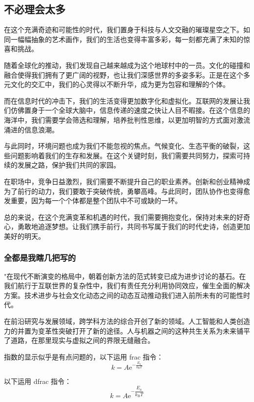 \documentclass[12pt,a4paper]{article}
\begin{document}
	\subsection{不必理会太多}
	\begin{multicols}{2}
		在这个充满奇迹和可能性的时代，我们置身于科技与人文交融的璀璨星空之下。如同一幅幅抽象的艺术画作，我们的生活也变得丰富多彩，每一刻都充满了未知的惊喜和挑战。			
		
		\lipsum[1-3]
		
		随着全球化的推动，我们发现自己越来越成为这个地球村中的一员。文化的碰撞和融合使得我们拥有了更广阔的视野，也让我们深感世界的多姿多彩。正是在这个多元文化的交汇中，我们的心灵得以不断升华，成为更为包容和理解的个体。
		
		而在信息时代的冲击下，我们的生活变得更加数字化和虚拟化。互联网的发展让我们仿佛置身于一个全球大脑中，信息传递的速度之快让人目不暇接。在这个信息的海洋中，我们需要学会筛选和理解，培养批判性思维，以更加明智的方式面对激流涌进的信息浪潮。
	
		与此同时，环境问题也成为我们不能忽视的焦点。气候变化、生态平衡的破裂，这些问题影响着我们的生存和发展。在这个关键时刻，我们需要共同努力，探索可持续的发展之路，保护我们共同的家园。
		
		在职场中，竞争日益激烈，我们需要不断提升自己的职业素养。创新和创业精神成为了前行的动力，我们要敢于突破传统，勇攀高峰。与此同时，团队协作也变得愈发重要，因为每一个个体都是整个团队中不可或缺的一环。
		
		总的来说，在这个充满变革和机遇的时代，我们需要拥抱变化，保持对未来的好奇心，勇敢地追逐梦想。让我们携手前行，共同书写属于我们的时代史诗，创造更加美好的明天。
	\end{multicols}
	\subsubsection{全都是我瞎几把写的}
		"在现代不断演变的格局中，朝着创新方法的范式转变已成为进步讨论的基石。在我们航行于互联世界的复杂性中，我们有责任充分利用协同效应，催生全面的解决方案。技术进步与社会文化动态之间的动态互动推动我们进入前所未有的可能性时代。
		
		在前沿研究与发展领域，跨学科方法的综合开创了新的领域。人工智能和人类创造力的并置为变革性突破打开了新的途径。人与机器之间的这种共生关系为未来铺平了道路，在那里现实与虚拟之间的界限无缝融合。
		
		指数的显示似乎是有点问题的，以下运用 frac 指令：
		$$
		k = A\mathrm{e}^{-\frac{E_a}{k_\mathrm{B}T}}
		$$
		
		以下运用 dfrac 指令：
	 	$$
		k = A\mathrm{e}^{-\dfrac{E_a}{k_\mathrm{B}T}}
		$$
		
\end{document}
